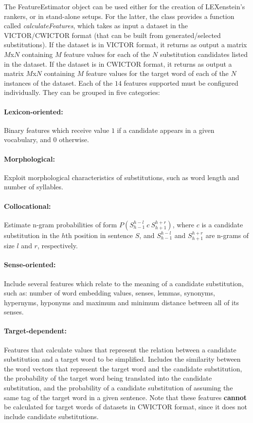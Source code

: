 The FeatureEstimator object can be used either for the creation of LEXenstein's rankers, or in stand-alone setups. For the latter, the class provides a function called \textit{calculateFeatures}, which takes as input a dataset in the VICTOR/CWICTOR format (that can be built from generated/selected substitutions). If the dataset is in VICTOR format, it returns as output a matrix $M$x$N$ containing $M$ feature values for each of the $N$ substitution candidates listed in the dataset. If the dataset is in CWICTOR format, it returns as output a matrix $M$x$N$ containing $M$ feature values for the target word of each of the $N$ instances of the dataset. Each of the $14$ features supported must be configured individually. They can be grouped in five categories:

\paragraph{Lexicon-oriented:} Binary features which receive value $1$ if a candidate appears in a given vocabulary, and $0$ otherwise.

\paragraph{Morphological:} Exploit morphological characteristics of substitutions, such as word length and number of syllables.

\paragraph{Collocational:} Estimate n-gram probabilities of form $P\left ( S_{h-1}^{h-l} \: c \: S_{h+1}^{h+r} \right )$, where $c$ is a candidate substitution in the $h$th position in sentence $S$, and $S_{h-1}^{h-l}$ and $S_{h+1}^{h+r}$ are n-grams of size $l$ and $r$, respectively.

\paragraph{Sense-oriented:} Include several features which relate to the meaning of a candidate substitution, such as: number of word embedding values, senses, lemmas, synonyms, hypernyms, hyponyms and maximum and minimum distance between all of its senses.

\paragraph{Target-dependent:} Features that calculate values that represent the relation between a candidate substitution and a target word to be simplified. Includes the similarity between the word vectors that represent the target word and the candidate substitution, the probability of the target word being translated into the candidate substitution, and the probability of a candidate substitution of assuming the same tag of the target word in a given sentence. Note that these features \textbf{cannot} be calculated for target words of datasets in CWICTOR format, since it does not include candidate substitutions.

